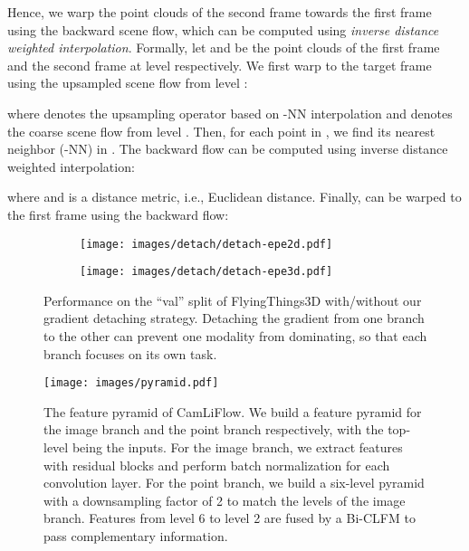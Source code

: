 \documentclass[10pt,twocolumn,letterpaper]{article}
\begin{document}
Hence, we warp the point clouds of the second frame towards the first frame using the backward scene flow, which can be computed using \textit{inverse distance weighted interpolation}. Formally, let  and  be the point clouds of the first frame and the second frame at level  respectively. We first warp  to the target frame using the upsampled scene flow from level :

where  denotes the upsampling operator based on -NN interpolation and  denotes the coarse scene flow from level . Then, for each point in , we find its  nearest neighbor (-NN) in . The backward flow  can be computed using inverse distance weighted interpolation:

where  and  is a distance metric, i.e., Euclidean distance. Finally,  can be warped to the first frame using the backward flow:


\begin{figure}[t]
    \centering
    \begin{subfigure}[b]{0.5\linewidth}
        \texttt{[image: images/detach/detach-epe2d.pdf]}\end{subfigure}\hfill
    \begin{subfigure}[b]{0.5\linewidth}
        \texttt{[image: images/detach/detach-epe3d.pdf]}\end{subfigure}\vspace{-5pt}
    \caption{Performance on the ``val'' split of FlyingThings3D with/without our gradient detaching strategy. Detaching the gradient from one branch to the other can prevent one modality from dominating, so that each branch focuses on its own task.}
    \vspace{-5pt}
    \label{fig:detach}
\end{figure}

\begin{figure*}
    \captionsetup[subfigure]{labelformat=empty}
    \texttt{[image: images/pyramid.pdf]}
    \caption{The feature pyramid of CamLiFlow. We build a feature pyramid for the image branch and the point branch respectively, with the top-level being the inputs. For the image branch, we extract features with residual blocks and perform batch normalization for each convolution layer. For the point branch, we build a six-level pyramid with a downsampling factor of 2 to match the levels of the image branch. Features from level 6 to level 2 are fused by a Bi-CLFM to pass complementary information.}
    \label{fig:pyramid}
\end{figure*}
\end{document}
